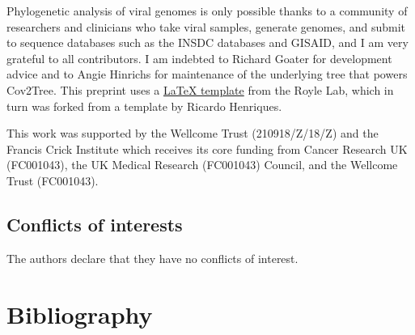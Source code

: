 Phylogenetic analysis of viral genomes is only possible thanks to a community of researchers and clinicians who take viral samples, generate genomes, and submit to sequence databases such as the INSDC databases and GISAID, and I am very grateful to all contributors. I am indebted to Richard Goater for development advice and to Angie Hinrichs for maintenance of the underlying tree that powers Cov2Tree. This preprint uses a \href{https://github.com/roylelab/manuscript-templates}{LaTeX template} from the Royle Lab, which in turn was forked from a template by Ricardo Henriques.

This work was supported by the Wellcome Trust (210918/Z/18/Z) and the Francis Crick Institute which receives its core funding from Cancer Research UK (FC001043), the UK Medical Research (FC001043) Council, and the Wellcome Trust (FC001043).


\subsection*{Conflicts of interests}
The authors declare that they have no conflicts of interest.



\section*{Bibliography}




